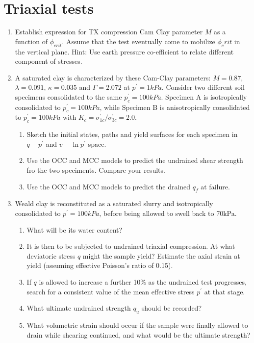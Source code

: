 \documentclass[a4paper,12pt]{article}
\begin{document}
\section{Triaxial tests}
\begin{enumerate}
	\item Establish expression for TX compression Cam Clay parameter $M$ as a function of $\phi_{crit}$. Assume that the test eventually come to mobilize $\phi_crit$ in the vertical plane. Hint: Use earth pressure co-efficient to relate different component of stresses. 
	
	\item A saturated clay is characterized by these Cam-Clay parameters: $M = 0.87$, $\lambda = 0.091$, $\kappa = 0.035$ and $\Gamma = 2.072$ at $p^\prime = 1 kPa$. 
	Consider two different soil specimens consolidated to the same $p_c^\prime = 100 kPa$. Specimen A is isotropically consolidated to $p_c^\prime = 100 kPa$, while Specimen B is anisotropically consolidated to $p_c^\prime = 100 kPa$ with $K_c = \sigma_{1c}^\prime / \sigma_{3c}^\prime = 2.0$. 
	\begin{enumerate}
		\item Sketch the initial states, paths and yield surfaces for each specimen in $q-p^\prime$ and $v - \ln p^\prime$ space. 
		\item Use the OCC and MCC models to predict the undrained shear strength fro the two speciments. Compare your results.
		\item Use the OCC and MCC models to predict the drained $q_f$ at failure.
	\end{enumerate}

	\item Weald clay is reconstituted as a saturated slurry and isotropically consolidated to $p^\prime = 100kPa$, before being allowed to swell back to 70kPa.
	\begin{enumerate}
		\item What will be its water content?
		\item It is then to be subjected to undrained triaxial compression. At what deviatoric stress $q$ might the sample yield? Estimate the axial strain at yield (assuming effective Poisson's ratio of 0.15).
		\item If $q$ is allowed to increase a further 10\% as the undrained test progresses, search for a consistent value of the mean effective stress $p^\prime$ at that stage.
		\item What ultimate undrained strength $q_u$ should be recorded?
		\item What volumetric strain should occur if the sample were finally allowed to drain while
		shearing continued, and what would be the ultimate strength?
	\end{enumerate}

\end{enumerate}
\end{document}
